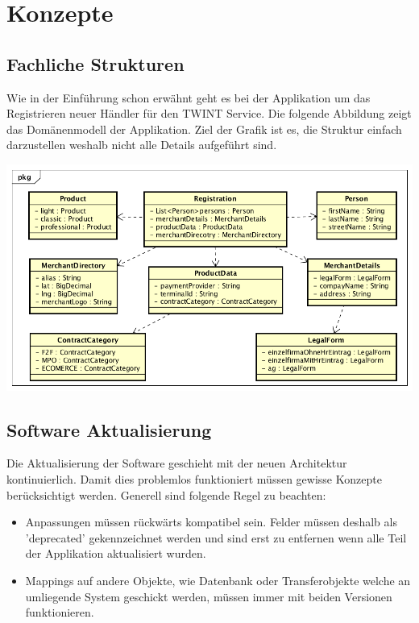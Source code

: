 \graphicspath{{./images/}}

\chapter{Konzepte}

\section{Fachliche Strukturen}

Wie in der Einführung schon erwähnt geht es bei der Applikation um das Registrieren neuer Händler für den TWINT Service. Die folgende Abbildung zeigt das Domänenmodell der Applikation. Ziel der Grafik ist es, die Struktur einfach darzustellen weshalb nicht alle Details aufgeführt sind. 

\begin{center}
	\includegraphics[scale=0.6]{DomainModel.png}
\end{center}

\section{Software Aktualisierung}
\label{software-update}

Die Aktualisierung der Software geschieht mit der neuen Architektur kontinuierlich. Damit dies problemlos funktioniert müssen gewisse Konzepte berücksichtigt werden. Generell sind folgende Regel zu beachten:
\begin{itemize}
	\item Anpassungen müssen rückwärts kompatibel sein. Felder müssen deshalb als 'deprecated' gekennzeichnet werden und sind erst zu entfernen wenn alle Teil der Applikation aktualisiert wurden.
	\item Mappings auf andere Objekte, wie Datenbank oder Transferobjekte welche an umliegende System geschickt werden, müssen immer mit beiden Versionen funktionieren.
\end{itemize}

